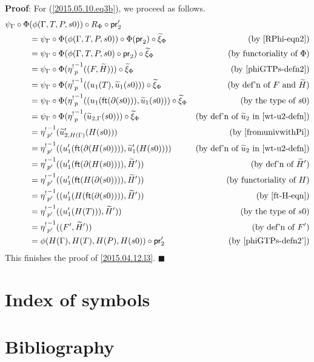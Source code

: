 \documentclass[12pt]{article}
\numberwithin{equation}{section}
\newenvironment{myproof}{{\bf Proof}:}{$\blacksquare$ \vskip 5mm }
\newcommand{\by}[1]{\text{(by #1)}}
\newcommand{\wt}{\widetilde}
\newcommand{\ft}{\mathsf{ft}}
\newcommand{\etashriek}{\eta^!}
\newcommand{\etaunshriek}{{\etashriek}^{-1}}
\newcommand{\pr}{\mathsf{pr}}
\begin{document}
\begin{myproof}
For (\ref{2015.05.10.eq3b}), we proceed as follows.
%
\begin{align*}
  \psi_{\Gamma}\circ \Phi&(\phi(\Gamma,T,P,s0))\circ R_{\Phi}\circ \pr_2'  \\
    & = \psi_{\Gamma}\circ \Phi(\phi(\Gamma,T,P,s0))\circ \Phi(\pr_2)\circ \wt{\xi}_{\Phi}  & \by{\ref{RPhi-eqn2}} \\
    & = \psi_{\Gamma}\circ \Phi(\phi(\Gamma,T,P,s0)\circ \pr_2)\circ \wt{\xi}_{\Phi}        & \by{functoriality of $\Phi$} \\
    & = \psi_{\Gamma}\circ \Phi(\etaunshriek_p((F,\wt{H})          ))\circ \wt{\xi}_{\Phi}  & \by{\ref{phiGTPs-defn2}} \\
    & = \psi_{\Gamma}\circ \Phi(\etaunshriek_p((u_1(T),\wt{u}_1(s0)))\circ \wt{\xi}_{\Phi}  & \by{def'n of $F$ and $\wt H$} \\
    & = \psi_{\Gamma}\circ \Phi(\etaunshriek_p((u_1(\ft(\partial(s0))),\wt{u}_1(s0)))\circ \wt{\xi}_{\Phi} & \by{the type of $s0$} \\
    & = \psi_{\Gamma}\circ \Phi(\etaunshriek_p(\wt u_{2,\Gamma}(s0)))\circ \wt{\xi}_{\Phi}  & \by{def'n of $\wt u_2$ in \ref{wt-u2-defn}} \\
    & = \etaunshriek_{p'}(\wt{u}_{2,H(\Gamma)}'(H(s0)))                                     & \by{\cite[Lemma 6.2(2)]{fromunivwithPi}} \\
    & = \etaunshriek_{p'}((u'_1(\ft(\partial(H(s0)))),\wt{u}'_1(H(s0))))                    & \by{def'n of $\wt u_2$ in \ref{wt-u2-defn}} \\
    & = \etaunshriek_{p'}((u'_1(\ft(\partial(H(s0)))),\wt H'))                              & \by{def'n of $\wt H'$} \\
    & = \etaunshriek_{p'}((u'_1(\ft(H(\partial(s0)))),\wt H'))                              & \by{functoriality of $H$} \\
    & = \etaunshriek_{p'}((u'_1(H(\ft(\partial(s0)))),\wt H'))                              & \by{\ref{ft-H-eqn}} \\
    & = \etaunshriek_{p'}((u'_1(H(T))),\wt H'))                                             & \by{the type of $s0$} \\
    & = \etaunshriek_{p'}((F',\wt H'))                                                      & \by{def'n of $F'$} \\
    & = \phi(H(\Gamma),H(T),H(P),H(s0))\circ \pr_2'                                         & \by{\ref{phiGTPs-defn2'}}
\end{align*}
This finishes the proof of \ref{2015.04.12.l3}.
\end{myproof}

\section{Index of symbols}
\printglossaries

\section{Bibliography}


\end{document}
